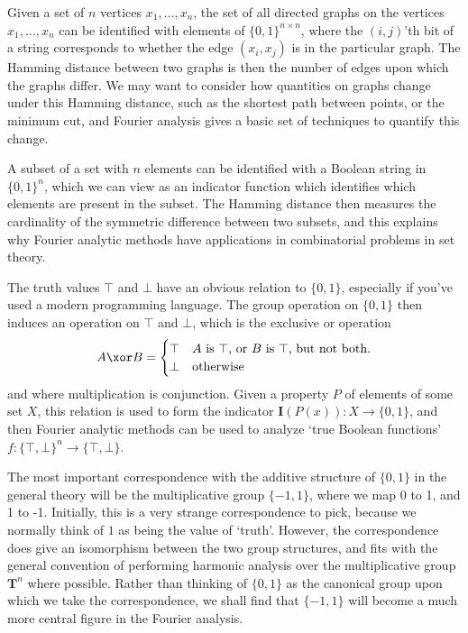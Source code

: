 \begin{example}
    Given a set of $n$ vertices $x_1, \dots, x_n$, the set of all directed graphs on the vertices $x_1, \dots, x_n$ can be identified with elements of $\{ 0, 1 \}^{n \times n}$, where the $(i,j)$'th bit of a string corresponds to whether the edge $(x_i, x_j)$ is in the particular graph. The Hamming distance between two graphs is then the number of edges upon which the graphs differ. We may want to consider how quantities on graphs change under this Hamming distance, such as the shortest path between points, or the minimum cut, and Fourier analysis gives a basic set of techniques to quantify this change.
\end{example}

\begin{example}
    A subset of a set with $n$ elements can be identified with a Boolean string in $\{ 0, 1 \}^n$, which we can view as an indicator function which identifies which elements are present in the subset. The Hamming distance then measures the cardinality of the symmetric difference between two subsets, and this explains why Fourier analytic methods have applications in combinatorial problems in set theory.
\end{example}

\begin{example}
    The truth values $\top$ and $\bot$ have an obvious relation to $\{ 0, 1 \}$, especially if you've used a modern programming language. The group operation on $\{ 0, 1 \}$ then induces an operation on $\top$ and $\bot$, which is the exclusive or operation
    \[ A \xor B = \begin{cases} \top & A\ \text{is}\ \top\text{, or}\ B\ \text{is}\ \top\text{, but not both.}\\ \bot & \text{otherwise} \end{cases} \]
    and where multiplication is conjunction. Given a property $P$ of elements of some set $X$, this relation is used to form the indicator $\mathbf{I}(P(x)): X \to \{ 0, 1 \}$, and then Fourier analytic methods can be used to analyze `true Boolean functions' $f: \{ \top, \bot \}^n \to \{ \top, \bot \}$.
\end{example}

The most important correspondence with the additive structure of $\{ 0, 1 \}$ in the general theory will be the multiplicative group $\{ -1, 1 \}$, where we map 0 to 1, and 1 to -1. Initially, this is a very strange correspondence to pick, because we normally think of $1$ as being the value of `truth'. However, the correspondence does give an isomorphism between the two group structures, and fits with the general convention of performing harmonic analysis over the multiplicative group $\mathbf{T}^n$ where possible. Rather than thinking of $\{ 0, 1 \}$ as the canonical group upon which we take the correspondence, we shall find that $\{ -1, 1 \}$ will become a much more central figure in the Fourier analysis.

